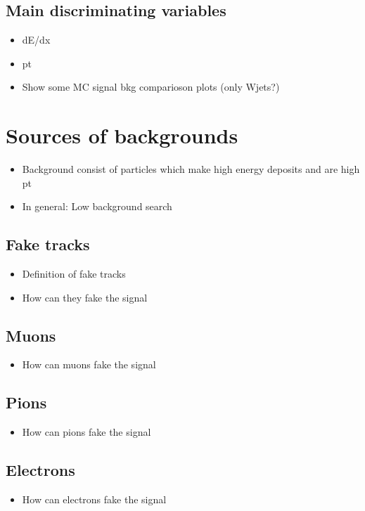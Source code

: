 \subsection{Main discriminating variables}
\begin{itemize}
\item dE/dx
\item pt
\item Show some MC signal bkg comparioson plots (only Wjets?)
\end{itemize}

\section{Sources of backgrounds}
\label{sec:SourcesOfBackgrounds}
\begin{itemize}
\item Background consist of particles which make high energy deposits and are high pt
\item In general: Low background search
\end{itemize}
\subsection{Fake tracks}
\begin{itemize}
\item Definition of fake tracks
\item How can they fake the signal
\end{itemize}
\subsection{Muons}
\begin{itemize}
\item How can muons fake the signal
\end{itemize}
\subsection{Pions}
\begin{itemize}
\item How can pions fake the signal
\end{itemize}
\subsection{Electrons}
\begin{itemize}
\item How can electrons fake the signal
\end{itemize}
